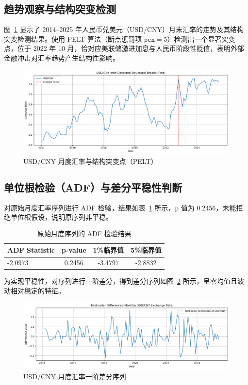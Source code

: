 \documentclass[11pt,a4paper]{article}
\begin{document}
\subsection{趋势观察与结构突变检测}

图~\ref{fig:monthly-breaks} 显示了 2014--2025 年人民币兑美元（USD/CNY）月末汇率的走势及其结构突变检测结果。使用 PELT 算法（断点惩罚项 $\texttt{pen}=5$）检测出一个显著突变点，位于 2022 年 10 月，恰对应美联储激进加息与人民币阶段性贬值，表明外部金融冲击对汇率趋势产生结构性影响。

\begin{figure}[H]
  \centering
  \includegraphics[width=1\textwidth]{./figures/yichang detection.png}
  \caption{USD/CNY 月度汇率与结构突变点（PELT）}
  \label{fig:monthly-breaks}
\end{figure}

\subsection{单位根检验（ADF）与差分平稳性判断}

对原始月度汇率序列进行 ADF 检验，结果如表~\ref{tab:adf-raw} 所示，p 值为 0.2456，未能拒绝单位根假设，说明原序列非平稳。

\vspace{1em}
\begin{table}[H]
  \centering
  \caption{原始月度序列的 ADF 检验结果}
  \begin{tabular}{lccc}
    \toprule
    ADF Statistic & p-value & 1\%临界值 & 5\%临界值 \\
    \midrule
    -2.0973 & 0.2456 & -3.4797 & -2.8832 \\
    \bottomrule
  \end{tabular}
  \label{tab:adf-raw}
\end{table}

为实现平稳性，对序列进行一阶差分，得到差分序列如图~\ref{fig:diff-series} 所示，呈零均值且波动相对稳定的特征。

\begin{figure}[H]
  \centering
  \includegraphics[width=1\textwidth]{./figures/diff1[0].png}
  \caption{USD/CNY 月度汇率一阶差分序列}
  \label{fig:diff-series}
\end{figure}
\end{document}
